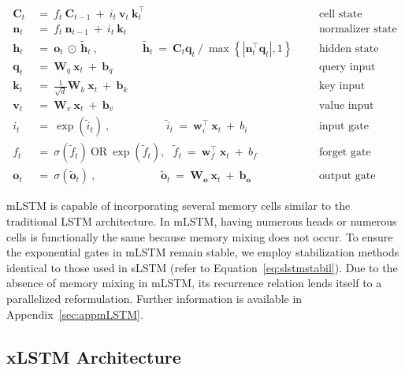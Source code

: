 \begin{align}
\label{eq:mlstm_recurrent_begin}
\mathbf{C}_t \ &= \  f_t \ \mathbf{C}_{t-1} \ + \ 
  i_t \ \mathbf{v}_t \ \mathbf{k}_t^\top & &  &\text{cell state} \\
\mathbf{n}_t \ &= \  f_t \ \mathbf{n}_{t-1} \ + \ 
  i_t \ \mathbf{k}_t & &  &\text{normalizer state} \\
\mathbf{h}_t  \ &= \ \mathbf{o}_t \ \odot \ \tilde{\mathbf{h}}_t
\ , \qquad \qquad 
\tilde{\mathbf{h}}_t \ = \   \mathbf{C}_t \mathbf{q}_t \ / \ 
  \max \left\{ |\mathbf{n}_t^\top \mathbf{q}_t|, 1 \right\} 
   &&&\text{hidden state} \\
\mathbf{q}_t \ &= \ \mathbf{W}_q \ \mathbf{x}_t \ + \ \mathbf{b}_q  & &  &\text{query input} \\
\mathbf{k}_t \ &= \ \frac{1}{\sqrt{d}} \mathbf{W}_k \ \mathbf{x}_t \ + \ \mathbf{b}_k  & &  &\text{key input} \\
\mathbf{v}_t \ &= \ \mathbf{W}_v \ \mathbf{x}_t \ + \ \mathbf{b}_v  & &  &\text{value input} \\
i_t \ &= \ \!\exp \!  \! \left( \tilde{i}_t  \right) \ , 
 \qquad \qquad \ \ \ \ \,
  \tilde{i}_t \ = \ \mathbf{w}^\top_{i} \ \mathbf{x}_t \ + \  b_{i} \ \ \ 
  &&&\text{input gate} \\
f_t \ &= \ \sigma \!  \left(  \tilde{f}_t \right) \ \text{OR} \ \!\exp \!  \! \left(  \tilde{f}_t \right) , \ \ \: \!
\tilde{f}_t \ = \ \mathbf{w}^\top_{f} \ \mathbf{x}_t  \ + \
  b_{f}
  &&& \text{forget gate} \\
\label{eq:mlstm_recurrent_end}
\mathbf{o}_t \ &= \ \sigma \left( \tilde{\mathbf{o}}_t \right) \ , \qquad \qquad \quad \ \ \ \,
  \tilde{\mathbf{o}}_t  \ = \ \mathbf{W}_{\mathbf{o}} \ \mathbf{x}_t \ + \
  \mathbf{b}_{\mathbf{o}}
  &&&\text{output gate} 
\end{align}

mLSTM is capable of incorporating several memory cells similar to the traditional LSTM architecture. In mLSTM, having numerous heads or numerous cells is functionally the same because memory mixing does not occur. To ensure the exponential gates in mLSTM remain stable, we employ stabilization methods identical to those used in sLSTM (refer to Equation~\ref{eq:slstmstabil}).  
Due to the absence of memory mixing in mLSTM, its recurrence relation lends itself to a parallelized reformulation. Further information is available in Appendix~\ref{sec:appmLSTM}.

\subsection{xLSTM Architecture}
\label{sec:xLSTMarch}

